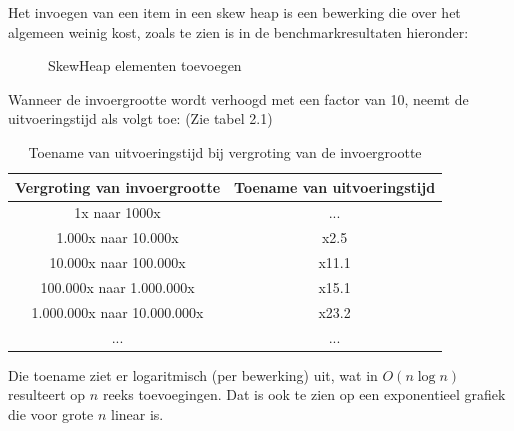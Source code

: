 \documentclass[12pt,a4paper,fleqn]{report}
\begin{document}
	Het invoegen van een item in een skew heap is een bewerking die over het algemeen weinig kost, zoals te zien is in de benchmarkresultaten hieronder:

\begin{figure}[htbp]
	\centering
	\caption{SkewHeap elementen toevoegen}
\end{figure}

	Wanneer de invoergrootte wordt verhoogd met een factor van 10, neemt de uitvoeringstijd
	als volgt toe: (Zie tabel 2.1)

\begin{table}[htbp]
	\centering

	\label{tab:uitvoeringstijd}
	\begin{tabular}{cc}
		\toprule
		\textbf{Vergroting van invoergrootte} & \textbf{Toename van uitvoeringstijd} \\
		\midrule
		1x naar 1000x & ... \\
		1.000x naar 10.000x & x2.5 \\
		10.000x naar 100.000x & x11.1 \\
		100.000x naar 1.000.000x & x15.1 \\
		1.000.000x naar 10.000.000x & x23.2 \\
		... & ... \\
		\bottomrule
	\end{tabular}
	\caption{Toename van uitvoeringstijd bij vergroting van de invoergrootte}
\end{table}

	Die toename ziet er logaritmisch (per bewerking) uit, wat in $O(n\log n)$ resulteert op
	$n$ reeks toevoegingen. Dat is ook te zien op een exponentieel grafiek die voor grote $n$
	linear is.
\end{document}
